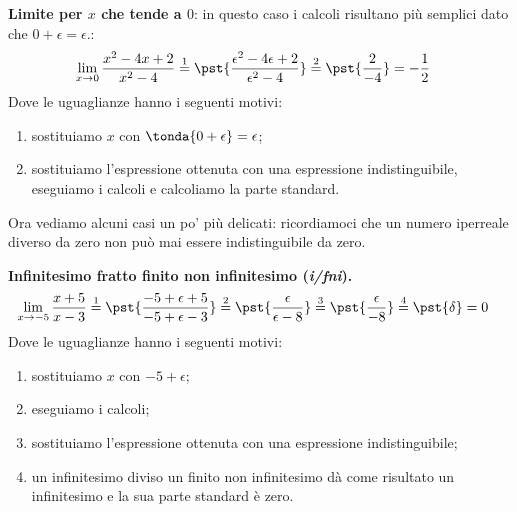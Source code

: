 \begin{esempio}
\textbf{Limite per \(x\) che tende a 
\(0\)}:
in questo caso i calcoli risultano più semplici dato che
\(0 + \epsilon = \epsilon\).: 
\begin{align*}
\lim_{x \rightarrow 0} \frac{x^2-4x+2}{x^2-4} & \stackrel{1}{=} 
  \pst{\frac{\epsilon^2-4\epsilon+2}{\epsilon^2-4}} \stackrel{2}{=}  
  \pst{\frac{2}{-4}} = -\frac{1}{2}
\end{align*}
Dove le uguaglianze hanno i seguenti motivi:
\begin{enumerate} [nosep]
 \item sostituiamo \(x\) con \(\tonda{0+\epsilon}=\epsilon\);
 \item sostituiamo l'espressione ottenuta con una espressione 
   indistinguibile, eseguiamo i calcoli e calcoliamo la parte standard.
\end{enumerate}
\end{esempio}

Ora vediamo alcuni casi un po' più delicati: ricordiamoci che un numero 
iperreale diverso da zero non può mai essere indistinguibile da zero.

\begin{esempio}
\textbf{Infinitesimo fratto finito non infinitesimo (\emph{i/fni}).}
\begin{align*}
\lim_{x \rightarrow -5} \frac{x+5}{x-3} & \stackrel{1}{=} 
  \pst{\frac{-5+\epsilon+5}{-5+\epsilon-3}} \stackrel{2}{=}  
  \pst{\frac{\epsilon}{\epsilon-8}} \stackrel{3}{=} 
  \pst{\frac{\epsilon}{-8}} \stackrel{4}{=} \pst{\delta} = 0
\end{align*}
Dove le uguaglianze hanno i seguenti motivi:
\begin{enumerate} [nosep]
 \item sostituiamo \(x\) con \(-5+\epsilon\);
 \item eseguiamo i calcoli;
 \item sostituiamo l'espressione ottenuta con una espressione 
   indistinguibile;
 \item un infinitesimo diviso un finito non infinitesimo dà come risultato 
un infinitesimo e la sua parte standard è zero.
\end{enumerate}
\end{esempio}

